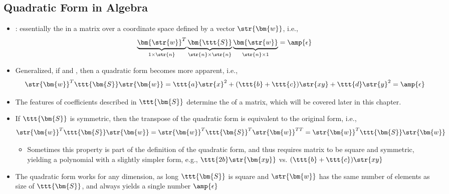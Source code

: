 \begin{itemize}
  \subsection{Quadratic Form in Algebra}\label{Quadratic Form in Algebra}
  \begin{itemize}
    \item {}: essentially the  in a matrix  over a coordinate space defined by a vector \(\str{\bm{w}}\), i.e.,
    \[%
    \underbrace{\bm{\str{w}}^T}_{1 \times \str{n} }
    \underbrace{\bm{\ttt{S}}}_{\str{n} \times \str{n} }
    \underbrace{\bm{\str{w}}}_{\str{n} \times 1} = \amp{\epsilon}
    \]%
    \item Generalized, if  and , then a quadratic form becomes more apparent, i.e.,
    \[%
    \str{\bm{w}}^T \ttt{\bm{S}} \str{\bm{w}} = \ttt{a}\str{x}^2 + (\ttt{b}+\ttt{c})\str{xy} + \ttt{d}\str{y}^2 = \amp{\epsilon}
    \]%
    \item The features of coefficients described in \(\ttt{\bm{S}}\) determine the \hyperref[Definiteness]{} of a matrix, which will be covered later in this chapter.
    \item If \(\ttt{\bm{S}}\) is symmetric, then the transpose of the quadratic form is equivalent to the original form, i.e.,
    \[%
    \str{\bm{w}}^T \ttt{\bm{S}} \str{\bm{w}} =  \str{\bm{w}}^{T} \ttt{\bm{S}}^T \str{\bm{w}}^{TT} =  \str{\bm{w}}^T \ttt{\bm{S}} \str{\bm{w}}
    \]%
    \begin{itemize}
      \item Sometimes this property is part of the definition of the quadratic form, and thus requires matrix  to be square and symmetric, yielding a polynomial with a slightly simpler form, e.g., \(\ttt{2b}\str{\bm{xy}}\) vs. \((\ttt{b}+\ttt{c})\str{xy}\)
    \end{itemize}
    \item The quadratic form works for any dimension, as long \(\ttt{\bm{S}}\) is square and \(\str{\bm{w}}\) has the same number of elements as size of \(\ttt{\bm{S}}\), and always yields a single number \(\amp{\epsilon}\)
  \end{itemize}
  

\end{itemize}
